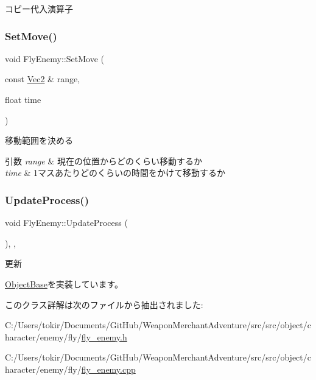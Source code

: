 コピー代入演算子 

\mbox{\label{class_fly_enemy_afc4616eb4d12d3b7c401f35002812330}} 
\subsubsection{\texorpdfstring{Set\+Move()}{SetMove()}}
{\footnotesize\ttfamily void Fly\+Enemy\+::\+Set\+Move (\begin{DoxyParamCaption}\item[{const \mbox{\hyperlink{common_8h_ae148fff5818e9444b4ab2288829559bf}{Vec2}} \&}]{range,  }\item[{float}]{time }\end{DoxyParamCaption})\hspace{0.3cm}{\ttfamily [inline]}}



移動範囲を決める 


\begin{DoxyParams}{引数}
{\em range} & 現在の位置からどのくらい移動するか \\
\hline
{\em time} & 1マスあたりどのくらいの時間をかけて移動するか \\
\hline
\end{DoxyParams}
\mbox{\label{class_fly_enemy_a5122c8fea26ebbd0390acfd6e41931ff}} 
\subsubsection{\texorpdfstring{Update\+Process()}{UpdateProcess()}}
{\footnotesize\ttfamily void Fly\+Enemy\+::\+Update\+Process (\begin{DoxyParamCaption}{ }\end{DoxyParamCaption})\hspace{0.3cm}{\ttfamily [final]}, {\ttfamily [protected]}, {\ttfamily [virtual]}}



更新 



\mbox{\hyperlink{class_object_base_a8b5b72b363a419767efde0b0e692ea95}{Object\+Base}}を実装しています。



このクラス詳解は次のファイルから抽出されました\+:\begin{DoxyCompactItemize}
\item 
C\+:/\+Users/tokir/\+Documents/\+Git\+Hub/\+Weapon\+Merchant\+Adventure/src/src/object/character/enemy/fly/\mbox{\hyperlink{fly__enemy_8h}{fly\+\_\+enemy.\+h}}\item 
C\+:/\+Users/tokir/\+Documents/\+Git\+Hub/\+Weapon\+Merchant\+Adventure/src/src/object/character/enemy/fly/\mbox{\hyperlink{fly__enemy_8cpp}{fly\+\_\+enemy.\+cpp}}\end{DoxyCompactItemize}
